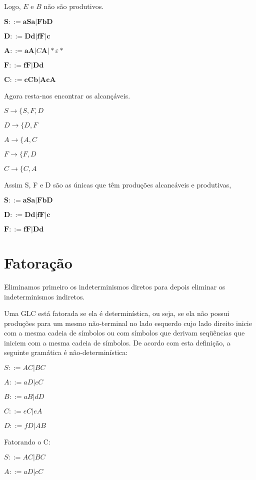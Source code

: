 \documentclass[]{article}
\begin{document}
	Logo, $E$ e $B$ não são produtivos.
	
		$\textbf{S}::=\textbf{a}\textbf{S}\textbf{a} | \textbf{F}\textbf{b}\textbf{D}$
	
	$\textbf{D}::= \textbf{D}\textbf{d} |\textbf{f}\textbf{F}|\textbf{c}$
	
	$\textbf{A}::=\textbf{a}\textbf{A}|C\textbf{A}|*\varepsilon*$
	
	$\textbf{F} ::= \textbf{f}\textbf{F} | \textbf{D}\textbf{d}$
	
	$\textbf{C} ::= \textbf{c}\textbf{Cb} | \textbf{A}\textbf{c}\textbf{A}$
	
	Agora resta-nos encontrar os alcançáveis.
	
	$S\to \{ S,F,D$
	
	$D\to \{ D, F$
	
	$A \to \{ A,C$
	
	$F \to \{ F,D$
	
	$C \to \{C, A$
	
	Assim S, F e D são as únicas que têm produções alcancáveis e produtivas,
	
			$\textbf{S}::=\textbf{a}\textbf{S}\textbf{a} | \textbf{F}\textbf{b}\textbf{D}$
	
	$\textbf{D}::= \textbf{D}\textbf{d} |\textbf{f}\textbf{F}|\textbf{c}$
	
	$\textbf{F} ::= \textbf{f}\textbf{F} | \textbf{D}\textbf{d}$
	
\section{Fatoração}
	Eliminamos primeiro os indeterminismos diretos para depois eliminar os indeterminismos indiretos.
	
	Uma GLC está  fatorada se ela é determinística, ou seja, se ela não possui produções para  um mesmo não-terminal no lado esquerdo cujo lado direito inicie com a mesma cadeia de símbolos  ou com símbolos que derivam seqüências que iniciem com a mesma cadeia de símbolos. De acordo  com esta definição, a seguinte gramática é não-determinística:  

	$S::= AC | BC$
	
	$A::= aD |cC$
	
	$B::= aB|dD$
	
	$C::= eC | eA$
	
	$D::= fD|AB$
	
	Fatorando o C:
		
	$S::= AC | BC$
	
	$A::= aD |cC$
	
\end{document}
